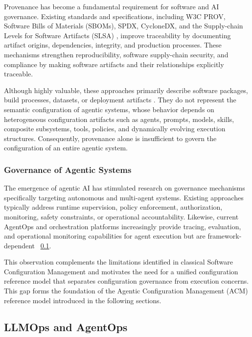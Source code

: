 \documentclass[10pt]{article}
\begin{document}
Provenance has become a fundamental requirement for software and AI governance. Existing standards and specifications, including W3C PROV, Software Bills of Materials (SBOMs), SPDX, CycloneDX, and the Supply-chain Levels for Software Artifacts (SLSA) \cite{multiple_references4}, improve traceability by documenting artifact origins, dependencies, integrity, and production processes. These mechanisms strengthen reproducibility, software supply-chain security, and compliance by making software artifacts and their relationships explicitly traceable.

Although highly valuable, these approaches primarily describe software packages, build processes, datasets, or deployment artifacts \cite{ref10}. They do not represent the semantic configuration of agentic systems, whose behavior depends on heterogeneous configuration artifacts such as agents, prompts, models, skills, composite subsystems, tools, policies, and dynamically evolving execution structures. Consequently, provenance alone is insufficient to govern the configuration of an entire agentic system.

\subsubsection{Governance of Agentic Systems}
\label{sec:agentic_governance}

The emergence of agentic AI has stimulated research on governance mechanisms specifically targeting autonomous and multi-agent systems. Existing approaches typically address runtime supervision, policy enforcement, authorization, monitoring, safety constraints, or operational accountability. Likewise, current AgentOps and orchestration platforms increasingly provide tracing, evaluation, and operational monitoring capabilities for agent execution but are framework-dependent ~\ref{sec:llmops_agentops}.

This observation complements the limitations identified in classical Software Configuration Management and motivates the need for a unified configuration reference model that separates configuration governance from execution concerns. This gap forms the foundation of the Agentic Configuration Management (ACM) reference model introduced in the following sections.

\subsection{LLMOps and AgentOps}
\label{sec:llmops_agentops}
\end{document}
